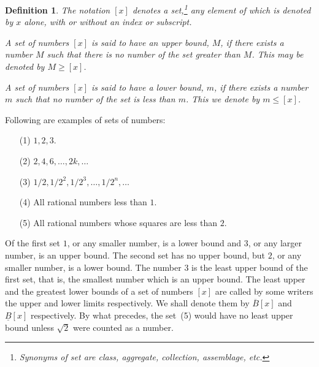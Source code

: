 \documentclass[a4paper,12pt]{book}[2004/02/16]
\providecommand{\leqq}{\leq}
\providecommand{\geqq}{\geq}
\providecommand{\hyperlink}[2]{#2}
\providecommand{\hypertarget}[2]{#2}
\theoremstyle{ilemma}
\theoremstyle{itheorem}
\theoremstyle{iother}
\theoremstyle{icorollary}
\theoremstyle{numcorollary}
\theoremstyle{idefinition}
\newtheorem*{definition}{Definition}
\begin{document}
\begin{definition}
The notation $[x]$ denotes a \textit{set},\footnote{%
    Synonyms of set are class, aggregate, collection, assemblage,
    etc.}
any element of which is denoted by $x$ alone, with or
without an index or subscript.

A set of numbers $[x]$ is said to have an \emph{upper bound},
$M$, if there exists a number $M$ such that there is no number
of the set greater than $M$. This may be denoted by $M \geqq [x]$.

A set of numbers $[x]$ is said to have a \emph{lower bound}, $m$, if
there exists a number $m$ such that no number of the set is
less than $m$. This we denote by $m \leqq [x]$.
\end{definition}

Following are examples of sets of numbers:
\begin{enumerate}
\item[(1)] $1,2,3$.
\item[(2)] $2,4,6,\ldots,2k,\ldots$
\item[(3)] $1/2,1/{2^2},1/{2^3},\ldots,1/{2^n},\ldots$
\item[(4)] All rational numbers less than $1$.
\item[(5)]\hypertarget{item5p3}{} All rational numbers whose squares are less than $2$.
\end{enumerate}

Of the first set $1$, or any smaller number, is a lower bound and $3$,
or any larger number, is an upper bound. The second set has no upper
bound, but $2$, or any smaller number, is a lower bound. The number
$3$ is the least upper bound of the first set, that is, the smallest
number which is an upper bound.  The least upper and the greatest
lower bounds of a set of numbers $[x]$ are called by some writers the
upper and lower limits respectively. We shall denote them by
$\overline{B}[x]$ and $\underline{B}[x]$ respectively.  By what
precedes, the set~\hyperlink{item5p3}{(5)} would have no least upper bound unless
$\sqrt{2}$ were counted as a number.
\end{document}
